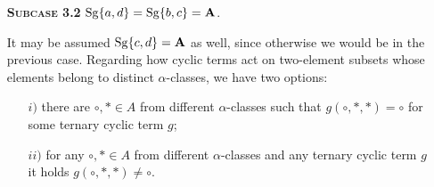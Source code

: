 \documentclass[11pt]{amsart}
\newcommand{\m}[1]{\mathbf{\uppercase{#1}}}
\theoremstyle{definition}
\theoremstyle{remark}
\theoremstyle{plain}
\newtheorem{claim}[thm]{Claim}
\begin{document}
\begin{enumerate}[wide, labelindent=0pt]
\begin{enumerate}[wide, labelindent=0pt]
    \begin{claim}
    It holds $g(b,c,d)=g(b,d,c)=c$, and, similarly, $g(a,c,d)=g(a,d,c)=d$.
    \end{claim}
    \begin{proof}
    Suppose, for the contradiction, that $g(b,d,c)=a$. Define the cyclic ternary term $g'$ by $$g'(x,y,z)=g(g(x,y,y),g(y,z,z),g(z,x,x)).$$ Then $g'(a,b,b)=g(c,b,d)=a$, which contradicts Claim~\ref{affine c(abb)=d}. The case $g(b,c,d)=a$ is handled similarly, just $g'$ is defined by $$g'(x,y,z)=g(g(x,x,y),g(y,y,z),g(z,z,x)).$$ The other two cases are analogous modulo switching $a$ with $b$ and $c$ with $d$.
    \end{proof}
    \begin{claim}
    There exists a cyclic term $g^*$ such that $g^*(a,b,b)=a$, which contradicts Claim~\ref{affine c(abb)=d}.
    \end{claim}
    \begin{proof}
    First, define the term $h$ by $h(x,y,z)=g(x,g(x,y,y),g(x,y,z))$ and then let $g^*$ be the cyclic term defined as $g^*(x,y,z):=g(h(x,y,z),h(y,z,x),h(z,x,y))$. We compute that \[g^*(a,b,b)=g(g(a,c,c),g(b,b,c),g(b,d,c))=g(a,c,c)=a,\] which contradicts Claim~\ref{affine c(abb)=d}.
    \end{proof}
    \item[\textsc{\textbf{Subcase 3.2}}] $\mathrm{Sg}\{a,d\}=\mathrm{Sg}\{b,c\}=\m a$.

    It may be assumed $\mathrm{Sg}\{c,d\}=\m a$ as well, since otherwise we would be in the previous case. Regarding how cyclic terms act on two-element subsets whose elements belong to distinct $\alpha$-classes, we have two options:
    \begin{itemize}
        \item[$i)$] there are $\circ,\ast\in A$ from different $\alpha$-classes such that $g(\circ,\ast,\ast)=\circ$ for some ternary cyclic term $g$;
        \item[$ii)$] for any $\circ,\ast\in A$ from different $\alpha$-classes and any ternary cyclic term $g$ it holds $g(\circ,\ast,\ast)\neq\circ$.
    \end{itemize}


\end{enumerate}
\end{enumerate}
\end{document}
